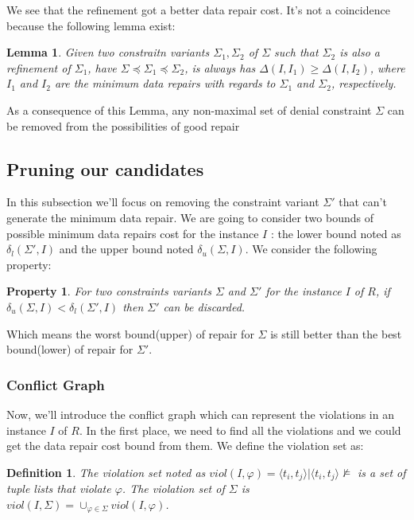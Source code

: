 \documentclass[letterpaper, 12pt]{report}
\newtheorem{mydef}{Definition}
\newtheorem{myprop}{Property}
\newtheorem{mylemma}{Lemma}
\begin{document}
We see that the refinement got a better data repair cost. It's not a coincidence because the following lemma exist: \cite{main}

\begin{mylemma}
 Given two constraitn variants $\Sigma_1,\Sigma_2$ of $\Sigma$ such that $\Sigma_2$
 is also a refinement of $\Sigma_1$, have $\Sigma \preceq \Sigma_1 \preceq \Sigma_2$, is always has $\Delta(I,I_1) \geq \Delta(I,I_2)$, where $I_1$ and $I_2$ are the minimum data repairs with regards to $\Sigma_1$ and $\Sigma_2$, respectively.
\end{mylemma}

As a consequence of this Lemma, any non-maximal set of denial constraint $\Sigma$ can be removed from the possibilities of good repair

\subsection{Pruning our candidates}

In this subsection we'll focus on removing the constraint variant $\Sigma '$ that can't generate the minimum data repair. We are going to  consider two bounds of possible minimum data repairs cost for the instance $I$ : the lower bound noted as $\delta_l(\Sigma',I)$ and the upper bound noted $\delta_u(\Sigma,I)$. We consider the following property:

\begin{myprop}
\label{boundRemove}
	For two constraints variants $\Sigma$ and $\Sigma'$ for the instance $I$ of $R$, if $\delta_u(\Sigma,I) < \delta_l(\Sigma',I)$ then $\Sigma'$ can be discarded.
\end{myprop}

Which means the worst bound(upper) of repair for $\Sigma$ is still better than the best bound(lower) of repair for $\Sigma'$.

\subsubsection{Conflict Graph}

Now, we'll introduce the conflict graph which can represent the violations in an instance $I$ of $R$. In the first place, we need to find all the violations and we could get the data repair cost bound from them. We define the violation set as: \cite{main}

\begin{mydef}
 The violation set noted as $viol(I,\varphi) = {\langle t_i,t_j \rangle | \langle t_i,t_j \rangle \not\models }$ is a set of tuple lists that violate $\varphi$. The violation set of $\Sigma$ is $viol(I,\Sigma) = \cup_{\varphi \in \Sigma}viol(I,\varphi)$.
\end{mydef}
\end{document}
